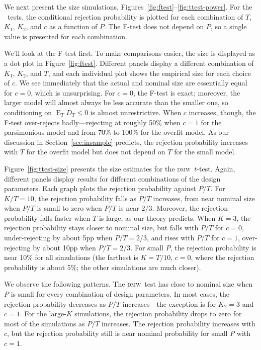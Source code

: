 \documentclass[11pt]{article}
\DeclareMathOperator{\E}{E}
\newcommand{\oosB}{\bar{D}_{T}}
\newcommand{\dmw}{\textsc{dmw}}
\begin{document}
We next present the size simulations,
Figures~\ref{fig:ftest}--\ref{fig:ttest-power}.  For the \oos\ tests,
the conditional rejection probability is plotted for each combination
of $T$, $K_1$, $K_2$, and $c$ as a function of $P$.  The F-test does
not depend on $P$, so a single value is presented for each
combination.

We'll look at the F-test first.  To make comparisons easier, the size
is displayed as a dot plot in Figure~\ref{fig:ftest}.  Different
panels display a different combination of $K_1$, $K_2$, and $T$, and
each individual plot shows the empirical size for each choice of $c$.
We see immediately that the actual and nominal size are essentially
equal for $c = 0$, which is unsurprising.  For $c = 0$, the F-test is
exact; moreover, the larger model will almost always be less accurate
than the smaller one, so conditioning on $\E_T \oosB \leq 0$ is
almost unrestrictive.  When $c$ increases, though, the F-test
over-rejects badly---rejecting at roughly 50\% when $c = 1$ for the
parsimonious model and from 70\% to 100\% for the overfit model.  As
our discussion in Section~\ref{sec:insample} predicts, the rejection
probability increases with $T$ for the overfit model but does not
depend on $T$ for the small model.

Figure~\ref{fig:ttest-size} presents the size estimates for the \dmw\
$t$-test.  Again, different panels display results for different
combinations of the design parameters.  Each graph plots the rejection
probability against $P/T$.  For $K/T=10$, the rejection probability
falls as $P/T$ increases, from near nominal size when $P/T$ is small
to zero when $P/T$ is near $2/3$.  Moreover, the rejection probability
falls faster when $T$ is large, as our theory predicts.  When $K=3$,
the rejection probability stays closer to nominal size, but falls with
$P/T$ for $c=0$, under-rejecting by about 5pp when $P/T = 2/3$, and
rises with $P/T$ for $c=1$, over-rejecting by about 10pp when
$P/T=2/3$.  For small $P$, the rejection probability is near 10\% for
all simulations (the farthest is $K=T/10$, $c=0$, where the rejection
probability is about 5\%; the other simulations are much closer).

We observe the following patterns.  The
\dmw\ test has close to nominal size when $P$ is small for every
combination of design parameters.  In most cases, the rejection
probability decreases as $P/T$ increases---the exception is for $K_2 =
3$ and $c=1$.  For the large-$K$ simulations, the rejection
probability drops to zero for most of the simulations as $P/T$
increases.  The rejection probability increases with $c$, but the
rejection probability still is near nominal probability for small $P$
with $c=1$.
\end{document}
